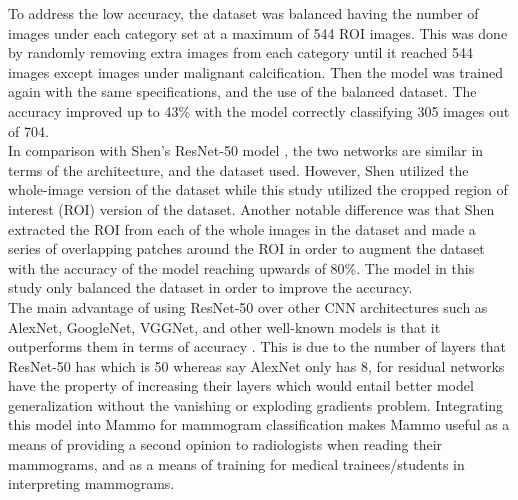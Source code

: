 	To address the low accuracy, the dataset was balanced having the number of images under each category set at a maximum of 544 ROI images. This was done by randomly removing extra images from each category until it reached 544 images except images under malignant calcification. Then the model was trained again with the same specifications, and the use of the balanced dataset. The accuracy improved up to 43\% with the model correctly classifying 305 images out of 704. \\

	In comparison with Shen's ResNet-50 model \cite{CNNmodel}, the two networks are similar in terms of the architecture, and the dataset used. However, Shen utilized the whole-image version of the dataset while this study utilized the cropped region of interest (ROI) version of the dataset. Another notable difference was that Shen extracted the ROI from each of the whole images in the dataset and made a series of overlapping patches around the ROI in order to augment the dataset with the accuracy of the model reaching upwards of 80\%. The model in this study only balanced the dataset in order to improve the accuracy. \\

	The main advantage of using ResNet-50 over other CNN architectures such as AlexNet, GoogleNet, VGGNet, and other well-known models is that it outperforms them in terms of accuracy \cite{CNNmodel}. This is due to the number of layers that ResNet-50 has which is 50 whereas say AlexNet only has 8, for residual networks have the property of increasing their layers which would entail better model generalization without the vanishing or exploding gradients problem. Integrating this model into Mammo for mammogram classification makes Mammo useful as a means of providing a second opinion to radiologists when reading their mammograms, and as a means of training for medical trainees/students in interpreting mammograms.

\clearpage